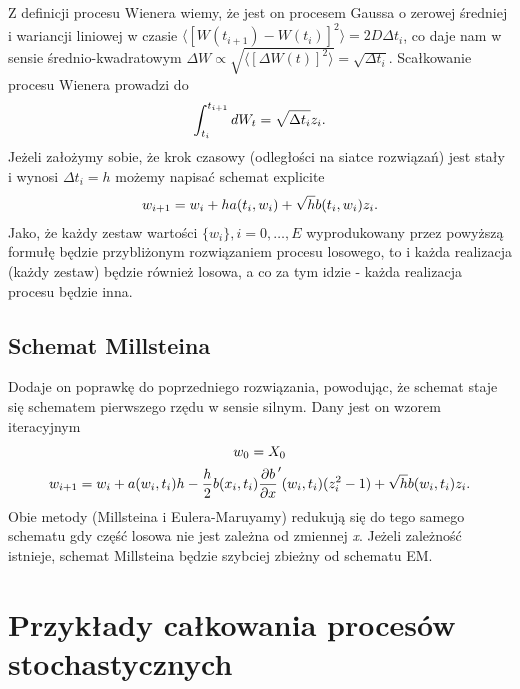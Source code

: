 \documentclass[a4paper,12pt,polish]{sphinxmanual}
\begin{document}
Z definicji procesu Wienera wiemy, że jest on procesem Gaussa o zerowej średniej i wariancji liniowej w czasie
$\langle [W(t_{i+1}) - W(t_i)]^2 \rangle = 2 D \Delta t_i$, co daje nam w sensie średnio-kwadratowym
$\Delta W \propto \sqrt{\langle [\Delta W (t)]^2 \rangle} = \sqrt{\Delta t_i}$. Scałkowanie procesu Wienera
prowadzi do
\begin{gather}
\begin{split}\int_{t_i}^{t_{i + 1}} dW_t = \sqrt{\Delta t_i} z_i.\end{split}\notag
\end{gather}
Jeżeli założymy sobie, że krok czasowy (odległości na siatce rozwiązań) jest stały i wynosi
$\Delta t_i = h$ możemy napisać schemat explicite
\begin{gather}
\begin{split}w_{i+1} = w_i + h a(t_i, w_i) + \sqrt{h} b(t_i, w_i) z_i.\end{split}\notag
\end{gather}
Jako, że każdy zestaw wartości $\{w_i\}, i=0,\dots,E$ wyprodukowany przez powyższą formułę
będzie przybliżonym rozwiązaniem procesu losowego, to i każda realizacja (każdy zestaw) będzie
również losowa, a co za tym idzie - każda realizacja procesu będzie inna.


\subsection{Schemat Millsteina}
\label{ch5/chV013:schemat-millsteina}
Dodaje on poprawkę do poprzedniego rozwiązania, powodując, że schemat staje się schematem pierwszego rzędu
w sensie silnym. Dany jest on wzorem iteracyjnym
\begin{gather}
\begin{split}w_0 = X_0\end{split}\notag\\\begin{split}w_{i+1} = w_i + a(w_i,t_i) h -
\frac{h}{2} b(x_i,t_i)\frac{\partial b}{\partial x}'(w_i,t_i)(z_i^2 - 1) +
\sqrt{h} b(w_i,t_i) z_i.\end{split}\notag
\end{gather}
Obie metody (Millsteina i Eulera-Maruyamy) redukują się do tego samego schematu gdy część losowa nie jest
zależna od zmiennej \emph{x}. Jeżeli zależność istnieje, schemat Millsteina będzie szybciej zbieżny od
schematu EM.


\section{Przykłady całkowania procesów stochastycznych}
\label{ch5/chV013:przyklady-calkowania-procesow-stochastycznych}
\end{document}
